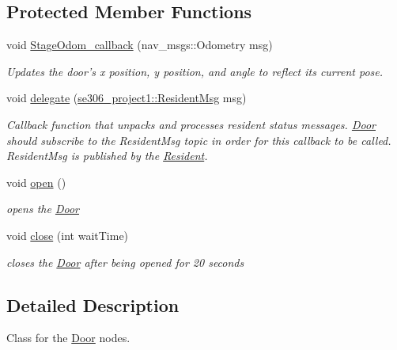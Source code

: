 \subsection*{Protected Member Functions}
\begin{DoxyCompactItemize}
\item 
void \hyperlink{classDoor_ae2c0e2da31af301f0761fad9618df595}{Stage\-Odom\-\_\-callback} (nav\-\_\-msgs\-::\-Odometry msg)
\begin{DoxyCompactList}\small\item\em Updates the door's x position, y position, and angle to reflect its current pose. \end{DoxyCompactList}\item 
void \hyperlink{classDoor_afe7ef9a01779f3cc6285ed0350175261}{delegate} (\hyperlink{structse306__project1_1_1ResidentMsg__}{se306\-\_\-project1\-::\-Resident\-Msg} msg)
\begin{DoxyCompactList}\small\item\em Callback function that unpacks and processes resident status messages. \hyperlink{classDoor}{Door} should subscribe to the Resident\-Msg topic in order for this callback to be called. Resident\-Msg is published by the \hyperlink{classResident}{Resident}. \end{DoxyCompactList}\item 
\hypertarget{classDoor_a141b8ac2ab99e1d7a218cdfb52004937}{void \hyperlink{classDoor_a141b8ac2ab99e1d7a218cdfb52004937}{open} ()}\label{classDoor_a141b8ac2ab99e1d7a218cdfb52004937}

\begin{DoxyCompactList}\small\item\em opens the \hyperlink{classDoor}{Door} \end{DoxyCompactList}\item 
\hypertarget{classDoor_a1610991c042246a8d66421201667e361}{void \hyperlink{classDoor_a1610991c042246a8d66421201667e361}{close} (int wait\-Time)}\label{classDoor_a1610991c042246a8d66421201667e361}

\begin{DoxyCompactList}\small\item\em closes the \hyperlink{classDoor}{Door} after being opened for 20 seconds \end{DoxyCompactList}\end{DoxyCompactItemize}


\subsection{Detailed Description}
Class for the \hyperlink{classDoor}{Door} nodes. 

